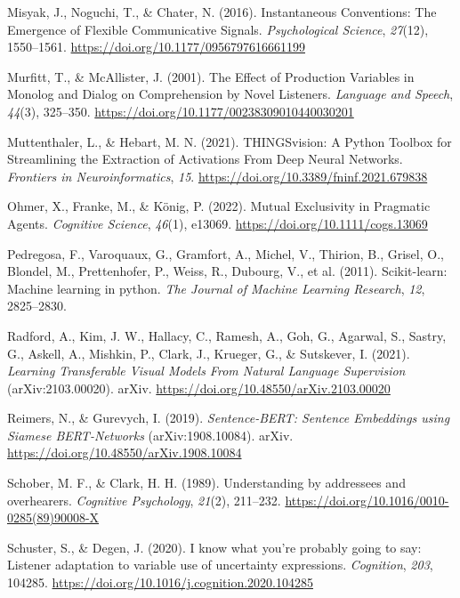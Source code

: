 \documentclass[10pt, letterpaper]{article}
\begin{document}
\begin{CSLReferences}{1}{0}
Misyak, J., Noguchi, T., \& Chater, N. (2016). Instantaneous
{Conventions}: {The Emergence} of {Flexible Communicative Signals}.
\emph{Psychological Science}, \emph{27}(12), 1550--1561.
\url{https://doi.org/10.1177/0956797616661199}

Murfitt, T., \& McAllister, J. (2001). The {Effect} of {Production
Variables} in {Monolog} and {Dialog} on {Comprehension} by {Novel
Listeners}. \emph{Language and Speech}, \emph{44}(3), 325--350.
\url{https://doi.org/10.1177/00238309010440030201}

Muttenthaler, L., \& Hebart, M. N. (2021). {THINGSvision}: {A Python
Toolbox} for {Streamlining} the {Extraction} of {Activations From Deep
Neural Networks}. \emph{Frontiers in Neuroinformatics}, \emph{15}.
\url{https://doi.org/10.3389/fninf.2021.679838}

Ohmer, X., Franke, M., \& König, P. (2022). Mutual {Exclusivity} in
{Pragmatic Agents}. \emph{Cognitive Science}, \emph{46}(1), e13069.
\url{https://doi.org/10.1111/cogs.13069}

Pedregosa, F., Varoquaux, G., Gramfort, A., Michel, V., Thirion, B.,
Grisel, O., Blondel, M., Prettenhofer, P., Weiss, R., Dubourg, V., et
al. (2011). Scikit-learn: {Machine} learning in python. \emph{The
Journal of Machine Learning Research}, \emph{12}, 2825--2830.

Radford, A., Kim, J. W., Hallacy, C., Ramesh, A., Goh, G., Agarwal, S.,
Sastry, G., Askell, A., Mishkin, P., Clark, J., Krueger, G., \&
Sutskever, I. (2021). \emph{Learning {Transferable Visual Models From
Natural Language Supervision}} (arXiv:2103.00020). arXiv.
\url{https://doi.org/10.48550/arXiv.2103.00020}

Reimers, N., \& Gurevych, I. (2019). \emph{Sentence-{BERT}: {Sentence
Embeddings} using {Siamese BERT-Networks}} (arXiv:1908.10084). arXiv.
\url{https://doi.org/10.48550/arXiv.1908.10084}

Schober, M. F., \& Clark, H. H. (1989). Understanding by addressees and
overhearers. \emph{Cognitive Psychology}, \emph{21}(2), 211--232.
\url{https://doi.org/10.1016/0010-0285(89)90008-X}

Schuster, S., \& Degen, J. (2020). I know what you're probably going to
say: {Listener} adaptation to variable use of uncertainty expressions.
\emph{Cognition}, \emph{203}, 104285.
\url{https://doi.org/10.1016/j.cognition.2020.104285}


\end{CSLReferences}
\end{document}
